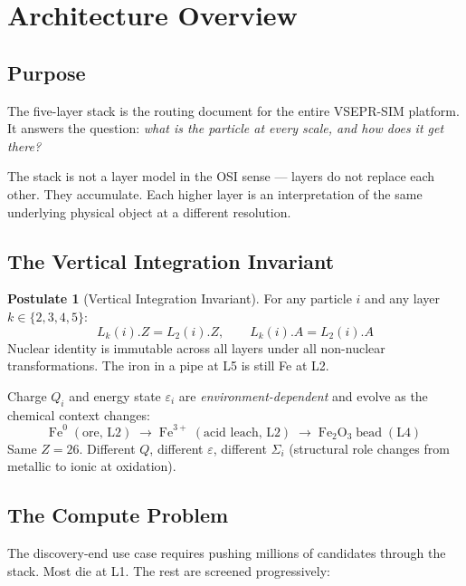 \documentclass[11pt, a4paper, oneside]{article}
\theoremstyle{definition}
\newtheorem{postulate}[definition]{Postulate}
\begin{document}
\tableofcontents
\clearpage

\section{Architecture Overview}
\label{sec:overview}

\subsection{Purpose}

The five-layer stack is the routing document for the entire VSEPR-SIM
platform.  It answers the question: \emph{what is the particle at every
scale, and how does it get there?}

The stack is not a layer model in the OSI sense — layers do not replace
each other.  They accumulate.  Each higher layer is an interpretation of
the same underlying physical object at a different resolution.

\subsection{The Vertical Integration Invariant}

\begin{postulate}[Vertical Integration Invariant]
For any particle $i$ and any layer $k \in \{2, 3, 4, 5\}$:
\[
  L_k(i).Z = L_2(i).Z, \qquad L_k(i).A = L_2(i).A
\]
Nuclear identity is immutable across all layers under all non-nuclear
transformations.  The iron in a pipe at L5 is still Fe at L2.
\end{postulate}

Charge $Q_i$ and energy state $\varepsilon_i$ are \emph{environment-dependent}
and evolve as the chemical context changes:
\[
  \mathrm{Fe}^0\;(\text{ore, L2}) \;\to\;
  \mathrm{Fe}^{3+}\;(\text{acid leach, L2}) \;\to\;
  \mathrm{Fe}_2\mathrm{O}_3\;\text{bead}\;(\text{L4})
\]
Same $Z = 26$.  Different $Q$, different $\varepsilon$, different $\Sigma_i$
(structural role changes from metallic to ionic at oxidation).

\subsection{The Compute Problem}

The discovery-end use case requires pushing millions of candidates through
the stack.  Most die at L1.  The rest are screened progressively:
\end{document}
